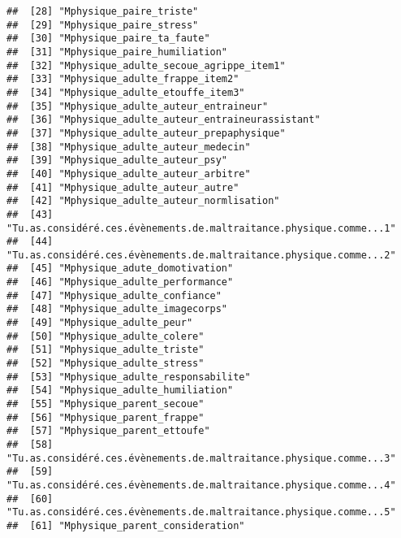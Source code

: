 \documentclass[
]{article}
\begin{document}
\begin{verbatim}
##  [28] "Mphysique_paire_triste"                                            
##  [29] "Mphysique_paire_stress"                                            
##  [30] "Mphysique_paire_ta_faute"                                          
##  [31] "Mphysique_paire_humiliation"                                       
##  [32] "Mphysique_adulte_secoue_agrippe_item1"                             
##  [33] "Mphysique_adulte_frappe_item2"                                     
##  [34] "Mphysique_adulte_etouffe_item3"                                    
##  [35] "Mphysique_adulte_auteur_entraineur"                                
##  [36] "Mphysique_adulte_auteur_entraineurassistant"                       
##  [37] "Mphysique_adulte_auteur_prepaphysique"                             
##  [38] "Mphysique_adulte_auteur_medecin"                                   
##  [39] "Mphysique_adulte_auteur_psy"                                       
##  [40] "Mphysique_adulte_auteur_arbitre"                                   
##  [41] "Mphysique_adulte_auteur_autre"                                     
##  [42] "Mphysique_adulte_auteur_normlisation"                              
##  [43] "Tu.as.considéré.ces.évènements.de.maltraitance.physique.comme...1" 
##  [44] "Tu.as.considéré.ces.évènements.de.maltraitance.physique.comme...2" 
##  [45] "Mphysique_adute_domotivation"                                      
##  [46] "Mphysique_adulte_performance"                                      
##  [47] "Mphysique_adulte_confiance"                                        
##  [48] "Mphysique_adulte_imagecorps"                                       
##  [49] "Mphysique_adulte_peur"                                             
##  [50] "Mphysique_adulte_colere"                                           
##  [51] "Mphysique_adulte_triste"                                           
##  [52] "Mphysique_adulte_stress"                                           
##  [53] "Mphysique_adulte_responsabilite"                                   
##  [54] "Mphysique_adulte_humiliation"                                      
##  [55] "Mphysique_parent_secoue"                                           
##  [56] "Mphysique_parent_frappe"                                           
##  [57] "Mphysique_parent_ettoufe"                                          
##  [58] "Tu.as.considéré.ces.évènements.de.maltraitance.physique.comme...3" 
##  [59] "Tu.as.considéré.ces.évènements.de.maltraitance.physique.comme...4" 
##  [60] "Tu.as.considéré.ces.évènements.de.maltraitance.physique.comme...5" 
##  [61] "Mphysique_parent_consideration"                                    

\end{verbatim}
\end{document}
